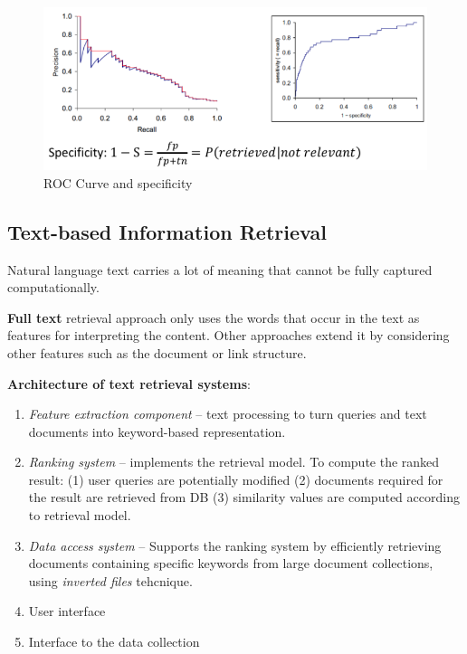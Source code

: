     \begin{figure}[htp]
      \centering
        \includegraphics[width=\textwidth]{images/roccurve.png}
        \caption{ROC Curve and specificity}
        \label{fig:roccurve}
    \end{figure}


  \subsection{Text-based Information Retrieval} %
  \label{sub:text_based_information_retrieval}
  Natural language text carries a lot of meaning that cannot be fully captured computationally.

  \textbf{Full text} retrieval approach only uses the words that occur in the text as features for interpreting the content. Other approaches extend it by considering other features such as the document or link structure.

  \textbf{Architecture of text retrieval systems}:
  \begin{enumerate}
    \item \emph{Feature extraction component} -- text processing to turn queries and text documents into keyword-based representation.
    \item \emph{Ranking system} -- implements the retrieval model. To compute the ranked result: (1) user queries are potentially modified (2) documents required for the result are retrieved from DB (3) similarity values are computed according to retrieval model.
    \item \emph{Data access system} -- Supports the ranking system by efficiently retrieving documents containing specific keywords from large document collections, using \emph{inverted files} tehcnique.
    \item User interface
    \item Interface to the data collection
  \end{enumerate}

